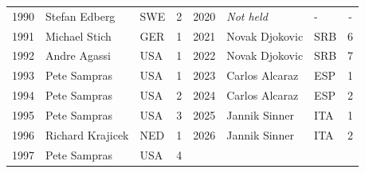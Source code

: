 \begin{tabular}{lllc@{\hspace{3.5em}}lllc}
1990 & Stefan Edberg & SWE & 2 & 2020 & \textit{Not held} & - & - \\
1991 & Michael Stich & GER & 1 & 2021 & Novak Djokovic & SRB & 6 \\
1992 & Andre Agassi & USA & 1 & 2022 & Novak Djokovic & SRB & 7 \\
1993 & Pete Sampras & USA & 1 & 2023 & Carlos Alcaraz & ESP & 1 \\
1994 & Pete Sampras & USA & 2 & 2024 & Carlos Alcaraz & ESP & 2 \\
1995 & Pete Sampras & USA & 3 & 2025 & Jannik Sinner & ITA & 1 \\
1996 & Richard Krajicek & NED & 1 & 2026 & Jannik Sinner & ITA & 2 \\
1997 & Pete Sampras & USA & 4 & & & & \\
\end{tabular}


%

